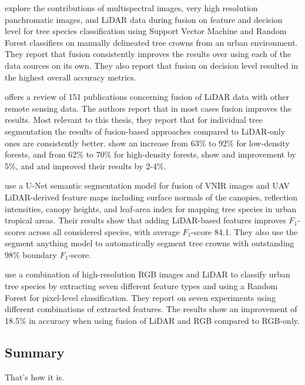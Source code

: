 \citet{liFusionApproachesIndividual2023} explore the contributions of multispectral images, very high resolution panchromatic images, and LiDAR data during fusion on feature and decision level for tree species classification using Support Vector Machine and Random Forest classifiers on manually delineated tree crowns from an urban environment.
They report that fusion consistently improves the results over using each of the data sources on its own.
They also report that fusion on decision level resulted in the highest overall accuracy metrics.

\citet{balestraLiDARDataFusion2024} offers a review of 151 publications concerning fusion of LiDAR data with other remote sensing data.
The authors report that in most cases fusion improves the results.
Most relevant to this thesis, they report that for individual tree segmentation the results of fusion-based approaches compared to LiDAR-only ones are consistently better.
\citet{laExtractionIndividualTree2015} show an increase from 63\% to 92\% for low-density forests, and from 62\% to 70\% for high-density forests, \citet{aubry-kientzMultisensorDataFusion2021} show and improvement by 5\%, and \citet{zhenImpactTreeOrientedGrowth2014} and \citet{arenas-corralizaAutomaticMappingTree2020} improved their results by 2-4\%.

\citet{ferreiraImprovingUrbanTree2024} use a U-Net semantic segmentation model for fusion of VNIR images and UAV LiDAR-derived feature maps including surface normals of the canopies, reflection intensities, canopy heights, and leaf-area index for mapping tree species in urban tropical areas.
Their results show that adding LiDAR-based features improves $F_1$-scores across all considered species, with average $F_1$-score 84.1.
They also use the segment anything model \citep{Kirillov_2023_ICCV} to automatically segment tree crowns with outstanding 98\% boundary $F_1$-score.

\citet{wuFineClassificationUrban2024} use a combination of high-resolution RGB images and LiDAR to classify urban tree species by extracting seven different feature types and using a Random Forest for pixel-level classification.
They report on seven experiments using different combinations of extracted features.
The results show an improvement of 18.5\% in accuracy when using fusion of LiDAR and RGB compared to RGB-only.

\subsection{Summary}

That's how it is.